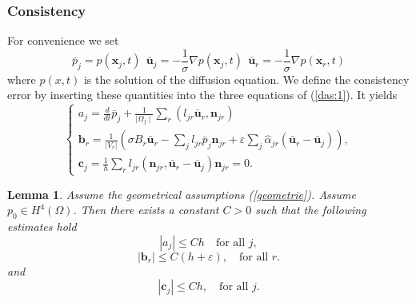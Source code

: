 \documentclass[a4paper,french,english,10pt]{article}
\newcommand\ljr{l_{jr}}
\newcommand\njr{\mathbf{n}_{jr}}
\newcommand\uu{\mathbf{u}}
\newcommand\eps{\varepsilon}
\newcommand\alj{\widehat{\alpha}_{jr}}
\newcommand\x{\mathbf{x}}
\newcommand\pej{\bar{p}_j}
\newcommand\uej{\bar{\uu}_j}
\newcommand\uer{\bar{\uu}_r}
\newcommand\cc{\mathbf{c}}
\newcommand\bb{\mathbf{b}}
\newcommand\cj{\cc_j}
\newcommand\br{\bb_r}
\newtheorem{lemma}[theorem]{Lemma}
\begin{document}
\subsubsection*{Consistency}

For convenience   we set
\begin{equation*} \label{eq:con1}
\pej=p(\x_j,t)\ \ \uej=-\frac{1}{\sigma}\nabla p(\x_j,t)\ \
\uer=-\frac{1}{\sigma}\nabla p(\x_r,t)
\end{equation*}
where $p(x,t)$ is the solution of the diffusion equation. 
 We define the consistency error 
by inserting these quantities into the three equations of
(\ref{das:1}). 
It yields 
\begin{equation*} \label{eq:d2.2}
\left\{ 
\begin{array}{l}
a_j=\displaystyle \frac{d}{dt} \pej+
\frac{1}{\mid\Omega_{j}\mid}\sum_{r}(l_{jr}\uer,\njr)\\
 \br=\frac{1}{\vert V_r\vert}\left (   \sigma B_r \uer- \sum_{j}\ljr
\pej\njr+ \eps\sum_j\alj(\uer-\uej)\right ), \\
\cj= \frac{1}{h}\sum_{r}l_{jr} (\njr,\uer -\uej)\njr=0.
\end{array}
\right.
\end{equation*}





\begin{lemma}\label{consistency}
Assume  the geometrical  assumptions (\ref{geometrie}).
Assume $p_0\in H^{4}(\Omega)$.
Then there exists a constant $C>0$ such that the following 
estimates hold
\begin{equation} \label{eq:d20}
\left| a_j\right|\leq C h
\quad
 \mbox{for all } j  ,
\end{equation}
\begin{equation} \label{eq:d21}
\left|  \br\right|  \leq C(h+\eps), \quad
\mbox{for all } r   .
\end{equation}
and
\begin{equation} \label{eq:d22}
\left| \cj\right| \leq C h, \quad
\mbox{for all } j   .
\end{equation}
\end{lemma}
\end{document}
